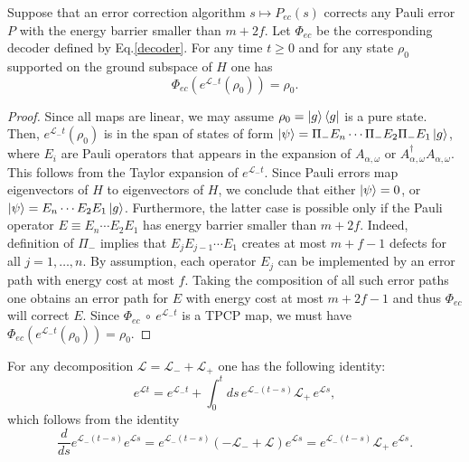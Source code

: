 \begin{lem}
\label{lem:Lp}
Suppose that an error correction algorithm $s \mapsto P_{ec}(s)$ corrects
any Pauli error $P$ with the energy barrier smaller than $m+2f$.
Let $\Phi_{ec}$ be the corresponding decoder defined by Eq.\eqref{decoder}.
For any time $t\ge 0$ and for any state $\rho_0$ supported on the ground subspace of $H$ one has
\begin{equation*}
\Phi_{ec}(e^{\mathcal L_- t}(\rho_0))=\rho_0.
\end{equation*}
\end{lem}
\begin{proof}
Since all maps are linear, we may assume $\rho_0 =\left| {g} \right\rangle\left\langle g \right|$ is a pure state.
Then, $e^{\mathcal L_- t}(\rho_0)$ is in the span of states of form $\left| {\psi} \right\rangle=\Pi_- E_n \cdots \Pi_- E_2 \Pi_- E_1 \left| {g} \right\rangle$,
where $E_i$ are Pauli operators that appears in the expansion of $A_{\alpha,\omega}$
or $A_{\alpha,\omega}^\dag A_{\alpha,\omega}$.
This follows from the Taylor expansion of $e^{\mathcal{L}_- t}$.
Since Pauli errors map eigenvectors of $H$ to eigenvectors of $H$, we conclude that
either $\left| {\psi} \right\rangle=0$, or $\left| {\psi} \right\rangle=E_n \cdots E_2 E_1 \left| {g} \right\rangle$.
Furthermore, the latter case is possible only if the Pauli operator $E\equiv E_n \cdots E_2 E_1$
has energy barrier smaller than $m+2f$. Indeed, definition of $\Pi_-$ implies that $E_j E_{j-1} \cdots E_1$
creates at most $m+f-1$ defects for all $j=1,\ldots,n$. By assumption, each operator $E_j$ can be implemented by an error
path with energy cost at most $f$. Taking the composition of all such error paths
one obtains an error path for $E$ with energy cost at most $m+2f-1$
and thus  $\Phi_{ec}$ will correct $E$.
Since $\Phi_{ec} \  \circ \  e^{\mathcal L_- t}$ is a TPCP map, we must have $\Phi_{ec}(e^{\mathcal L_- t}(\rho_0))=\rho_0$.
\end{proof}

For any decomposition $\mathcal L=\mathcal L_- + \mathcal L_+$ one has the following identity:
\begin{equation}
e^{\mathcal L t} = e^{\mathcal L_- t} + \int_0^t ds \, e^{\mathcal L_- (t-s)} \mathcal L_+ \, e^{\mathcal L s},
\label{eq:exp}
\end{equation}
which follows from the identity
\[
\frac{d}{ds} e^{\mathcal L_-(t-s)} e^{\mathcal L s} = e^{\mathcal L_- (t-s)} (-\mathcal L_- + \mathcal L) e^{\mathcal L s} =  e^{\mathcal L_- (t-s)} \mathcal L_+ \, e^{\mathcal L s}.
\]


